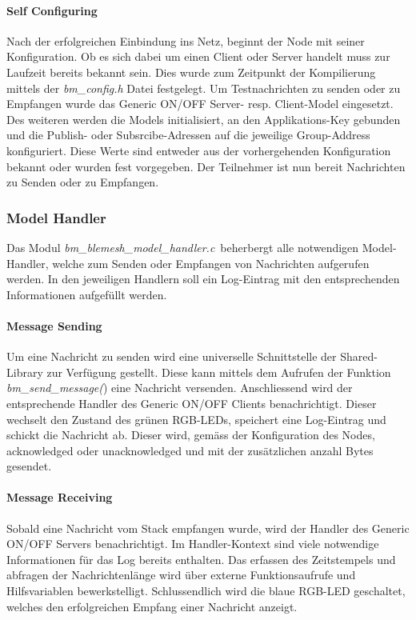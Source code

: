 \paragraph{Self Configuring}
Nach der erfolgreichen Einbindung ins Netz, beginnt der Node mit seiner Konfiguration. Ob es sich dabei um einen Client oder Server handelt muss zur Laufzeit bereits bekannt sein. Dies wurde zum Zeitpunkt der Kompilierung mittels der \textit{bm\_config.h} Datei festgelegt. Um Testnachrichten zu senden oder zu Empfangen wurde das Generic ON/OFF Server- resp. Client-Model eingesetzt. Des weiteren werden die Models initialisiert, an den Applikations-Key gebunden und die Publish- oder Subsrcibe-Adressen auf die jeweilige Group-Address konfiguriert. Diese Werte sind entweder aus der vorhergehenden Konfiguration bekannt oder wurden fest vorgegeben. Der Teilnehmer ist nun bereit Nachrichten zu Senden oder zu Empfangen. 
 

\subsubsection{Model Handler}\label{subsubsec:BluetoothMeshUmsetzungnRFConnectSDKModelHandler}
Das Modul \textit{bm\_blemesh\_model\_handler.c}\footnotemark\ beherbergt alle notwendigen Model-Handler, welche zum Senden oder Empfangen von Nachrichten aufgerufen werden. In den jeweiligen Handlern soll ein Log-Eintrag mit den entsprechenden Informationen aufgefüllt werden. 




\paragraph{Message Sending}
Um eine Nachricht zu senden wird eine universelle Schnittstelle der Shared-Library zur Verfügung gestellt. Diese kann mittels dem Aufrufen der Funktion \textit{bm\_send\_message(}) eine Nachricht versenden. Anschliessend wird der entsprechende Handler des Generic ON/OFF Clients benachrichtigt. Dieser wechselt den Zustand des grünen RGB-LEDs, speichert eine Log-Eintrag und schickt die Nachricht ab. Dieser wird, gemäss der Konfiguration des Nodes, acknowledged oder unacknowledged  und mit der zusätzlichen anzahl Bytes gesendet. 

\paragraph{Message Receiving}
Sobald eine Nachricht vom Stack empfangen wurde, wird der Handler des Generic ON/OFF Servers benachrichtigt. Im Handler-Kontext sind viele notwendige Informationen für das Log bereits enthalten. Das erfassen des Zeitstempels und abfragen der Nachrichtenlänge wird über externe Funktionsaufrufe und Hilfsvariablen bewerkstelligt. Schlussendlich wird die blaue RGB-LED geschaltet, welches den erfolgreichen Empfang einer Nachricht anzeigt. 


